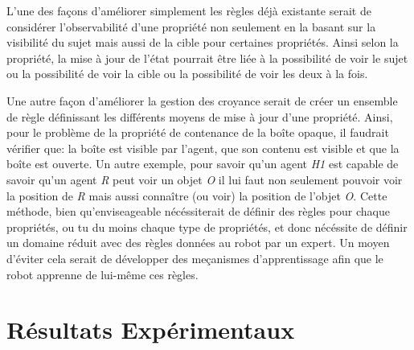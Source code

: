 \documentclass[a4paper,11pt,twoside]{StyleThese}
\begin{document}
L'une des façons d'améliorer simplement les règles déjà existante serait de considérer l'observabilité d'une propriété non seulement en la basant sur la visibilité du sujet mais aussi de la cible pour certaines propriétés. Ainsi selon la propriété, la mise à jour de l'état pourrait être liée à la possibilité de voir le sujet ou la possibilité de voir la cible ou la possibilité de voir les deux à la fois.

Une autre façon d'améliorer la gestion des croyance serait de créer un ensemble de règle définissant les différents moyens de mise à jour d'une propriété.
Ainsi, pour le problème de la propriété de contenance de la boîte opaque, il faudrait vérifier que: la boîte est visible par l'agent, que son contenu est visible et que la boîte est ouverte.
Un autre exemple, pour savoir qu'un agent \textit{H1} est capable de savoir qu'un agent \textit{R} peut voir un objet \textit{O} il lui faut non seulement pouvoir voir la position de \textit{R} mais aussi connaître (ou voir) la position de l'objet \textit{O}.
Cette méthode, bien qu'enviseageable nécéssiterait de définir des règles pour chaque propriétés, ou tu du moins chaque type de propriétés, et donc nécéssite de définir un domaine réduit avec des règles données au robot par un expert.
Un moyen d'éviter cela serait de développer des meçanismes d'apprentissage afin que le robot apprenne de lui-même ces règles.






\section{Résultats Expérimentaux}
\end{document}
